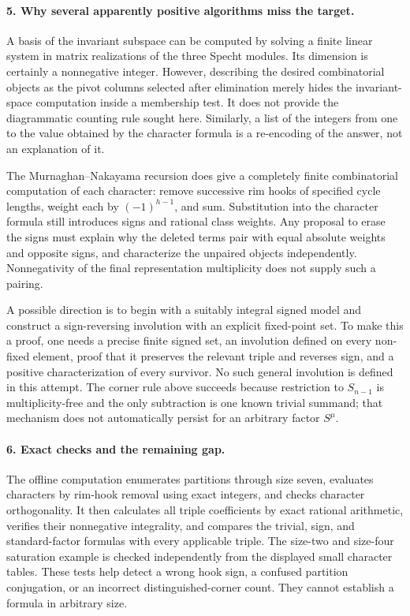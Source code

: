 \documentclass[11pt]{article}
\begin{document}
\paragraph{5. Why several apparently positive algorithms miss the target.}
A basis of the invariant subspace can be computed by solving a finite linear system in matrix realizations of the three Specht modules. Its dimension is certainly a nonnegative integer. However, describing the desired combinatorial objects as the pivot columns selected after elimination merely hides the invariant-space computation inside a membership test. It does not provide the diagrammatic counting rule sought here. Similarly, a list of the integers from one to the value obtained by the character formula is a re-encoding of the answer, not an explanation of it.

The Murnaghan--Nakayama recursion does give a completely finite combinatorial computation of each character: remove successive rim hooks of specified cycle lengths, weight each by $(-1)^{h-1}$, and sum. Substitution into the character formula still introduces signs and rational class weights. Any proposal to erase the signs must explain why the deleted terms pair with equal absolute weights and opposite signs, and characterize the unpaired objects independently. Nonnegativity of the final representation multiplicity does not supply such a pairing.

A possible direction is to begin with a suitably integral signed model and construct a sign-reversing involution with an explicit fixed-point set. To make this a proof, one needs a precise finite signed set, an involution defined on every non-fixed element, proof that it preserves the relevant triple and reverses sign, and a positive characterization of every survivor. No such general involution is defined in this attempt. The corner rule above succeeds because restriction to $S_{n-1}$ is multiplicity-free and the only subtraction is one known trivial summand; that mechanism does not automatically persist for an arbitrary factor $S^\mu$.

\paragraph{6. Exact checks and the remaining gap.}
The offline computation enumerates partitions through size seven, evaluates characters by rim-hook removal using exact integers, and checks character orthogonality. It then calculates all triple coefficients by exact rational arithmetic, verifies their nonnegative integrality, and compares the trivial, sign, and standard-factor formulas with every applicable triple. The size-two and size-four saturation example is checked independently from the displayed small character tables. These tests help detect a wrong hook sign, a confused partition conjugation, or an incorrect distinguished-corner count. They cannot establish a formula in arbitrary size.
\end{document}
